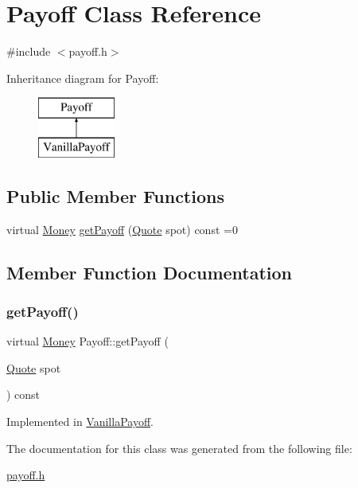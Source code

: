 \hypertarget{class_payoff}{}\section{Payoff Class Reference}
\label{class_payoff}


{\ttfamily \#include $<$payoff.\+h$>$}

Inheritance diagram for Payoff\+:\begin{figure}[H]
\begin{center}
\leavevmode
\includegraphics[height=2.000000cm]{class_payoff}
\end{center}
\end{figure}
\subsection*{Public Member Functions}
\begin{DoxyCompactItemize}
\item 
virtual \hyperlink{_name_def_8h_a5a9d48c16a694e9a2d9f1eca730dc8c5}{Money} \hyperlink{class_payoff_a908e732330294a111345b4183ddb025b}{get\+Payoff} (\hyperlink{_name_def_8h_a642a6c5fd87319d922637de0e0bb0305}{Quote} spot) const =0
\end{DoxyCompactItemize}


\subsection{Member Function Documentation}
\hypertarget{class_payoff_a908e732330294a111345b4183ddb025b}{}\label{class_payoff_a908e732330294a111345b4183ddb025b} 
\subsubsection{\texorpdfstring{get\+Payoff()}{getPayoff()}}
{\footnotesize\ttfamily virtual \hyperlink{_name_def_8h_a5a9d48c16a694e9a2d9f1eca730dc8c5}{Money} Payoff\+::get\+Payoff (\begin{DoxyParamCaption}\item[{\hyperlink{_name_def_8h_a642a6c5fd87319d922637de0e0bb0305}{Quote}}]{spot }\end{DoxyParamCaption}) const\hspace{0.3cm}{\ttfamily [pure virtual]}}



Implemented in \hyperlink{class_vanilla_payoff_aa141f5b29c30d54448c93a21bef83bb3}{Vanilla\+Payoff}.



The documentation for this class was generated from the following file\+:\begin{DoxyCompactItemize}
\item 
\hyperlink{payoff_8h}{payoff.\+h}\end{DoxyCompactItemize}

